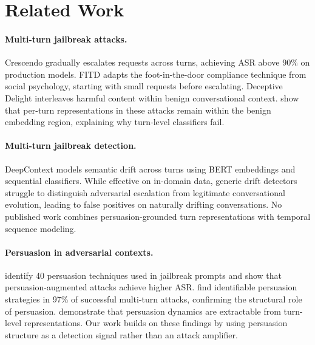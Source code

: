 \documentclass[11pt,a4paper]{article}
\begin{document}
\section{Related Work}

\paragraph{Multi-turn jailbreak attacks.}
Crescendo \citep{russinovich2024greatwritearticle} gradually escalates requests across turns, achieving ASR above 90\% on production models.
FITD \citep{zhou2024speak} adapts the foot-in-the-door compliance technique from social psychology, starting with small requests before escalating.
Deceptive Delight \citep{jiang2024deceptivedelight} interleaves harmful content within benign conversational context.
\citet{bullwinkel2025multiturnjailbreaks} show that per-turn representations in these attacks remain within the benign embedding region, explaining why turn-level classifiers fail.

\paragraph{Multi-turn jailbreak detection.}
DeepContext \citep{deepcontext2026} models semantic drift across turns using BERT embeddings and sequential classifiers.
While effective on in-domain data, generic drift detectors struggle to distinguish adversarial escalation from legitimate conversational evolution, leading to false positives on naturally drifting conversations.
No published work combines persuasion-grounded turn representations with temporal sequence modeling.

\paragraph{Persuasion in adversarial contexts.}
\citet{zeng2024pap} identify 40 persuasion techniques used in jailbreak prompts and show that persuasion-augmented attacks achieve higher ASR.
\citet{hagendorff2026persuasion} find identifiable persuasion strategies in 97\% of successful multi-turn attacks, confirming the structural role of persuasion.
\citet{howdollmspersuade2025} demonstrate that persuasion dynamics are extractable from turn-level representations.
Our work builds on these findings by using persuasion structure as a detection signal rather than an attack amplifier.
\end{document}
